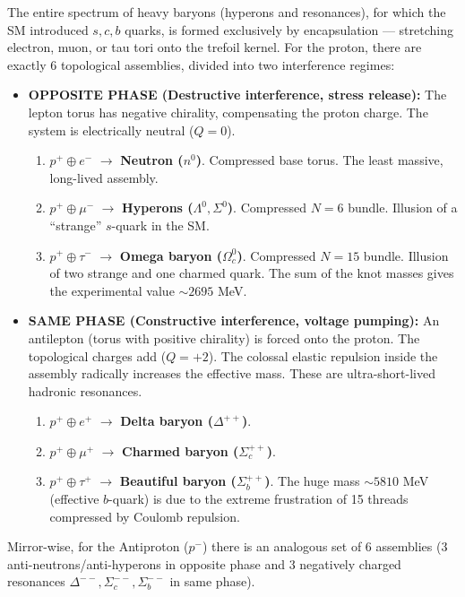 \documentclass[11pt,a4paper]{article}
\begin{document}
The entire spectrum of heavy baryons (hyperons and resonances), for which the SM introduced $s, c, b$ quarks, is formed exclusively by encapsulation — stretching electron, muon, or tau tori onto the trefoil kernel. For the proton, there are exactly 6 topological assemblies, divided into two interference regimes:
\begin{itemize}
    \item \textbf{OPPOSITE PHASE (Destructive interference, stress release):} The lepton torus has negative chirality, compensating the proton charge. The system is electrically neutral ($Q=0$). 
    \begin{enumerate}
        \item $p^+ \oplus e^-$ $\longrightarrow$ \textbf{Neutron ($n^0$)}. Compressed base torus. The least massive, long-lived assembly.
        \item $p^+ \oplus \mu^-$ $\longrightarrow$ \textbf{Hyperons ($\Lambda^0, \Sigma^0$)}. Compressed $N=6$ bundle. Illusion of a ``strange'' $s$-quark in the SM.
        \item $p^+ \oplus \tau^-$ $\longrightarrow$ \textbf{Omega baryon ($\Omega_c^0$)}. Compressed $N=15$ bundle. Illusion of two strange and one charmed quark. The sum of the knot masses gives the experimental value $\sim 2695$ MeV.
    \end{enumerate}
    
    \item \textbf{SAME PHASE (Constructive interference, voltage pumping):} An antilepton (torus with positive chirality) is forced onto the proton. The topological charges add ($Q=+2$). The colossal elastic repulsion inside the assembly radically increases the effective mass. These are ultra-short-lived hadronic resonances.
    \begin{enumerate}
        \item $p^+ \oplus e^+$ $\longrightarrow$ \textbf{Delta baryon ($\Delta^{++}$)}.
        \item $p^+ \oplus \mu^+$ $\longrightarrow$ \textbf{Charmed baryon ($\Sigma_c^{++}$)}.
        \item $p^+ \oplus \tau^+$ $\longrightarrow$ \textbf{Beautiful baryon ($\Sigma_b^{++}$)}. The huge mass $\sim 5810$ MeV (effective $b$-quark) is due to the extreme frustration of 15 threads compressed by Coulomb repulsion.
    \end{enumerate}
\end{itemize}

Mirror-wise, for the Antiproton ($p^-$) there is an analogous set of 6 assemblies (3 anti-neutrons/anti-hyperons in opposite phase and 3 negatively charged resonances $\Delta^{--}, \Sigma_c^{--}, \Sigma_b^{--}$ in same phase). 
\end{document}

